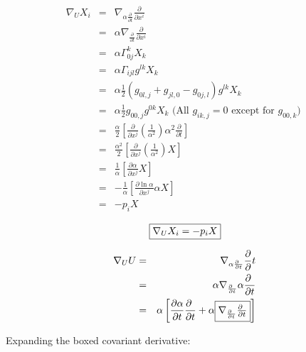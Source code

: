 \begin{eqnarray}
\nonumber
\nabla_UX_i &=& \nabla_{\alpha \frac{\partial}{\partial t}} \frac{\partial}{\partial x^i} \\ 
\nonumber
&=& \alpha \nabla_{\frac{\partial}{\partial t}}\frac{\partial}{\partial x^i} \\
\nonumber
&=& \alpha \Gamma_{0j}^k X_k \\
\nonumber
&=& \alpha \Gamma_{ijl}g^{lk} X_k \\
\nonumber
&=& \alpha \frac{1}{2}\left(g_{0l,j}+g_{jl,0}-g_{0j,l}\right)g^{lk} X_k \\
\nonumber
&=& \alpha \frac{1}{2}g_{00,j}g^{0k} X_k \mbox{\ \ \ \ (All $g_{ik,j}=0$ except for $g_{00,k}$) }\\
\nonumber
&=& \frac{\alpha}{2}\left[\frac{\partial}{\partial x^j}(\frac{1}{\alpha^2}) \alpha^2 \frac{\partial}{\partial t} \right] \\
\nonumber
&=& \frac{\alpha^2}{2}\left[\frac{\partial}{\partial x^j}(\frac{1}{\alpha^2}) X \right] \\
\nonumber
&=& \frac{1}{\alpha}\left[\frac{\partial \alpha}{\partial x^j} X \right] \\
\nonumber
&=& -\frac{1}{\alpha}\left[\frac{\partial \ln \alpha}{\partial x^j} \alpha X \right] \\
\nonumber
&=& - p_i X
\end{eqnarray}

\begin{equation}
\framebox{$\nabla_{U}X_i = -p_i X$}
\label{nUX}
\end{equation}

\begin{eqnarray}
\nonumber
\nabla_{U} U &=& \nabla_{\alpha \frac{\partial \ }{\partial t}}{\frac{\partial}\partial t} \\
\nonumber
&=&\alpha\nabla_{\frac{\partial \ }{\partial t}}\alpha \frac{\partial \ }{\partial t} \\
&=& \alpha \left[ \frac{\partial \alpha}{\partial t} \frac{\partial \ }{\partial t} + \alpha \mbox{\framebox{$\nabla_{\frac{\partial \ }{\partial t}}{\frac{\partial \ }{\partial t}}$}} \right ] \label{ntt}
\end{eqnarray}

Expanding the boxed covariant derivative:

